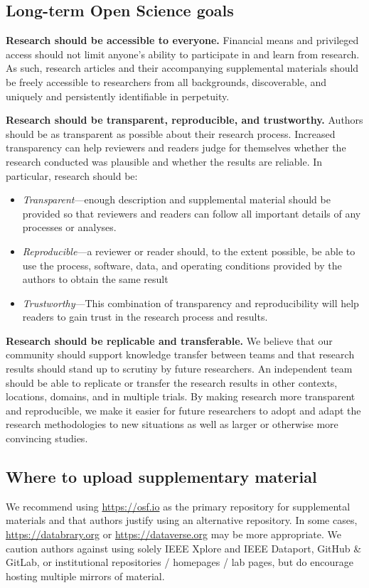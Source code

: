 \documentclass[journal]{vgtc}                %
\begin{document}
\subsection{Long-term Open Science goals}

\textbf{Research should be accessible to everyone.}
Financial means and privileged access should not limit anyone's ability to participate in and learn from research.
As such, research articles and their accompanying supplemental materials should be freely accessible to researchers from all backgrounds, discoverable, and uniquely and persistently identifiable in perpetuity.

\textbf{Research should be transparent, reproducible, and trustworthy.}
Authors should be as transparent as possible about their research process.
Increased transparency can help reviewers and readers judge for themselves whether the research conducted was plausible and whether the results are reliable.
In particular, research should be:
\begin{itemize}
  \item \textit{Transparent}---enough description and supplemental material should be provided so that reviewers and readers can follow all important details of any processes or analyses.

  \item \textit{Reproducible}---a reviewer or reader should, to the extent possible, be able to use the process, software, data, and operating conditions provided by the authors to obtain the same result

  \item \textit{Trustworthy}---This combination of transparency and reproducibility will help readers to gain trust in the research process and results.
\end{itemize}

\textbf{Research should be replicable and transferable.}
We believe that our community should support knowledge transfer between teams and that research results should stand up to scrutiny by future researchers. An independent team should be able to replicate or transfer the research results in other contexts, locations, domains, and in multiple trials. By making research more transparent and reproducible, we make it easier for future researchers to adopt and adapt the research methodologies to new situations as well as larger or otherwise more convincing studies.

\subsection{Where to upload supplementary material}
We recommend using \url{https://osf.io} as the primary repository for supplemental materials and that authors justify using an alternative repository.
In some cases, \url{https://databrary.org} or \url{https://dataverse.org} may be more appropriate.
We caution authors against using solely IEEE Xplore and IEEE Dataport, GitHub \& GitLab, or institutional repositories / homepages / lab pages, but do encourage hosting multiple mirrors of material.
\end{document}
